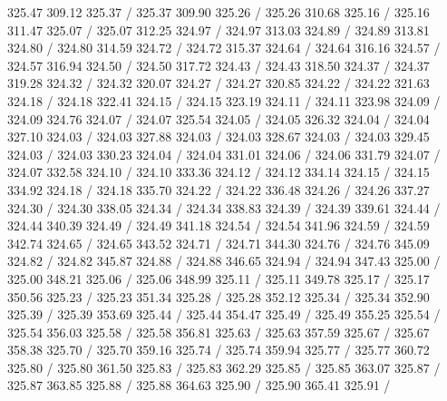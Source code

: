 { 325.47 309.12 325.37 /
 325.37 309.90 325.26 /
 325.26 310.68 325.16 /
 325.16 311.47 325.07 /
 325.07 312.25 324.97 /
 324.97 313.03 324.89 /
 324.89 313.81 324.80 /
 324.80 314.59 324.72 /
 324.72 315.37 324.64 /
 324.64 316.16 324.57 /
 324.57 316.94 324.50 /
 324.50 317.72 324.43 /
 324.43 318.50 324.37 /
 324.37 319.28 324.32 /
 324.32 320.07 324.27 /
 324.27 320.85 324.22 /
 324.22 321.63 324.18 /
 324.18 322.41 324.15 /
 324.15 323.19 324.11 /
 324.11 323.98 324.09 /
 324.09 324.76 324.07 /
 324.07 325.54 324.05 /
 324.05 326.32 324.04 /
 324.04 327.10 324.03 /
 324.03 327.88 324.03 /
 324.03 328.67 324.03 /
 324.03 329.45 324.03 /
 324.03 330.23 324.04 /
 324.04 331.01 324.06 /
 324.06 331.79 324.07 /
 324.07 332.58 324.10 /
 324.10 333.36 324.12 /
 324.12 334.14 324.15 /
 324.15 334.92 324.18 /
 324.18 335.70 324.22 /
 324.22 336.48 324.26 /
 324.26 337.27 324.30 /
 324.30 338.05 324.34 /
 324.34 338.83 324.39 /
 324.39 339.61 324.44 /
 324.44 340.39 324.49 /
 324.49 341.18 324.54 /
 324.54 341.96 324.59 /
 324.59 342.74 324.65 /
 324.65 343.52 324.71 /
 324.71 344.30 324.76 /
 324.76 345.09 324.82 /
 324.82 345.87 324.88 /
 324.88 346.65 324.94 /
 324.94 347.43 325.00 /
 325.00 348.21 325.06 /
 325.06 348.99 325.11 /
 325.11 349.78 325.17 /
 325.17 350.56 325.23 /
 325.23 351.34 325.28 /
 325.28 352.12 325.34 /
 325.34 352.90 325.39 /
 325.39 353.69 325.44 /
 325.44 354.47 325.49 /
 325.49 355.25 325.54 /
 325.54 356.03 325.58 /
 325.58 356.81 325.63 /
 325.63 357.59 325.67 /
 325.67 358.38 325.70 /
 325.70 359.16 325.74 /
 325.74 359.94 325.77 /
 325.77 360.72 325.80 /
 325.80 361.50 325.83 /
 325.83 362.29 325.85 /
 325.85 363.07 325.87 /
 325.87 363.85 325.88 /
 325.88 364.63 325.90 /
 325.90 365.41 325.91 /
}
